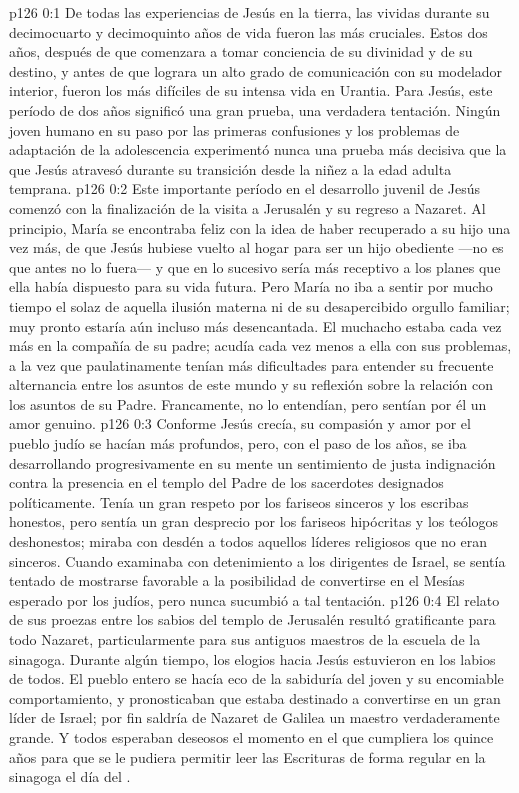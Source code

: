 \author{Comisión de seres intermedios}
\vs p126 0:1 De todas las experiencias de Jesús en la tierra, las vividas durante su decimocuarto y decimoquinto años de vida fueron las más cruciales. Estos dos años, después de que comenzara a tomar conciencia de su divinidad y de su destino, y antes de que lograra un alto grado de comunicación con su modelador interior, fueron los más difíciles de su intensa vida en Urantia. Para Jesús, este período de dos años significó una gran prueba, una verdadera tentación. Ningún joven humano en su paso por las primeras confusiones y los problemas de adaptación de la adolescencia experimentó nunca una prueba más decisiva que la que Jesús atravesó durante su transición desde la niñez a la edad adulta temprana.
\vs p126 0:2 Este importante período en el desarrollo juvenil de Jesús comenzó con la finalización de la visita a Jerusalén y su regreso a Nazaret. Al principio, María se encontraba feliz con la idea de haber recuperado a su hijo una vez más, de que Jesús hubiese vuelto al hogar para ser un hijo obediente ---no es que antes no lo fuera--- y que en lo sucesivo sería más receptivo a los planes que ella había dispuesto para su vida futura. Pero María no iba a sentir por mucho tiempo el solaz de aquella ilusión materna ni de su desapercibido orgullo familiar; muy pronto estaría aún incluso más desencantada. El muchacho estaba cada vez más en la compañía de su padre; acudía cada vez menos a ella con sus problemas, a la vez que paulatinamente tenían más dificultades para entender su frecuente alternancia entre los asuntos de este mundo y su reflexión sobre la relación con los asuntos de su Padre. Francamente, no lo entendían, pero sentían por él un amor genuino.
\vs p126 0:3 \pc Conforme Jesús crecía, su compasión y amor por el pueblo judío se hacían más profundos, pero, con el paso de los años, se iba desarrollando progresivamente en su mente un sentimiento de justa indignación contra la presencia en el templo del Padre de los sacerdotes designados políticamente. Tenía un gran respeto por los fariseos sinceros y los escribas honestos, pero sentía un gran desprecio por los fariseos hipócritas y los teólogos deshonestos; miraba con desdén a todos aquellos líderes religiosos que no eran sinceros. Cuando examinaba con detenimiento a los dirigentes de Israel, se sentía tentado de mostrarse favorable a la posibilidad de convertirse en el Mesías esperado por los judíos, pero nunca sucumbió a tal tentación.
\vs p126 0:4 \pc El relato de sus proezas entre los sabios del templo de Jerusalén resultó gratificante para todo Nazaret, particularmente para sus antiguos maestros de la escuela de la sinagoga. Durante algún tiempo, los elogios hacia Jesús estuvieron en los labios de todos. El pueblo entero se hacía eco de la sabiduría del joven y su encomiable comportamiento, y pronosticaban que estaba destinado a convertirse en un gran líder de Israel; por fin saldría de Nazaret de Galilea un maestro verdaderamente grande. Y todos esperaban deseosos el momento en el que cumpliera los quince años para que se le pudiera permitir leer las Escrituras de forma regular en la sinagoga el día del .
